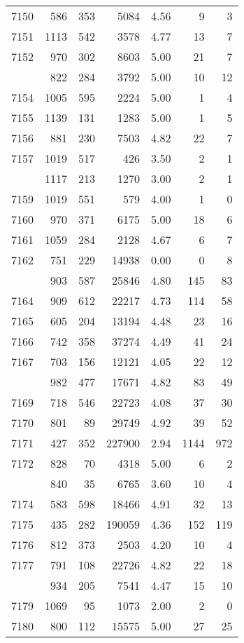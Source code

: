 \documentclass[
]{article}
\begin{document}
\begin{table}
\begin{tabular}[t]{lrrrrrr}
7150 & 586 & 353 & 5084 & 4.56 & 9 & 3\\
7151 & 1113 & 542 & 3578 & 4.77 & 13 & 7\\
7152 & 970 & 302 & 8603 & 5.00 & 21 & 7\\
\addlinespace
7153 & 822 & 284 & 3792 & 5.00 & 10 & 12\\
7154 & 1005 & 595 & 2224 & 5.00 & 1 & 4\\
7155 & 1139 & 131 & 1283 & 5.00 & 1 & 5\\
7156 & 881 & 230 & 7503 & 4.82 & 22 & 7\\
7157 & 1019 & 517 & 426 & 3.50 & 2 & 1\\
\addlinespace
7158 & 1117 & 213 & 1270 & 3.00 & 2 & 1\\
7159 & 1019 & 551 & 579 & 4.00 & 1 & 0\\
7160 & 970 & 371 & 6175 & 5.00 & 18 & 6\\
7161 & 1059 & 284 & 2128 & 4.67 & 6 & 7\\
7162 & 751 & 229 & 14938 & 0.00 & 0 & 8\\
\addlinespace
7163 & 903 & 587 & 25846 & 4.80 & 145 & 83\\
7164 & 909 & 612 & 22217 & 4.73 & 114 & 58\\
7165 & 605 & 204 & 13194 & 4.48 & 23 & 16\\
7166 & 742 & 358 & 37274 & 4.49 & 41 & 24\\
7167 & 703 & 156 & 12121 & 4.05 & 22 & 12\\
\addlinespace
7168 & 982 & 477 & 17671 & 4.82 & 83 & 49\\
7169 & 718 & 546 & 22723 & 4.08 & 37 & 30\\
7170 & 801 & 89 & 29749 & 4.92 & 39 & 52\\
7171 & 427 & 352 & 227900 & 2.94 & 1144 & 972\\
7172 & 828 & 70 & 4318 & 5.00 & 6 & 2\\
\addlinespace
7173 & 840 & 35 & 6765 & 3.60 & 10 & 4\\
7174 & 583 & 598 & 18466 & 4.91 & 32 & 13\\
7175 & 435 & 282 & 190059 & 4.36 & 152 & 119\\
7176 & 812 & 373 & 2503 & 4.20 & 10 & 4\\
7177 & 791 & 108 & 22726 & 4.82 & 22 & 18\\
\addlinespace
7178 & 934 & 205 & 7541 & 4.47 & 15 & 10\\
7179 & 1069 & 95 & 1073 & 2.00 & 2 & 0\\
7180 & 800 & 112 & 15575 & 5.00 & 27 & 25\\

\end{tabular}
\end{table}
\end{document}
